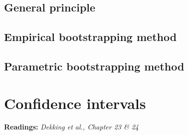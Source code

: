 \documentclass[a4paper]{article}
\begin{document}
\subsection{General principle}
\subsection{Empirical bootstrapping method}
\subsection{Parametric bootstrapping method}

\newpage

\section{Confidence intervals}
\textbf{Readings:} \textit{Dekking et al., Chapter 23 \& 24}
\end{document}
